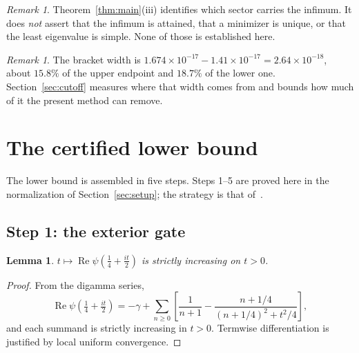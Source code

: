 \documentclass[11pt,a4paper]{article}
\newtheorem{lemma}[theorem]{Lemma}
\theoremstyle{definition}
\theoremstyle{remark}
\newtheorem{remark}[theorem]{Remark}
\begin{document}
\begin{remark}
Theorem~\ref{thm:main}(iii) identifies which sector carries the infimum. It does
\emph{not} assert that the infimum is attained, that a minimizer is unique, or
that the least eigenvalue is simple. None of those is established here.
\end{remark}

\begin{remark}
The bracket width is $1.674\times10^{-17} - 1.41\times10^{-17} = 2.64\times
10^{-18}$, about $15.8\%$ of the upper endpoint and $18.7\%$ of the lower one. Section~\ref{sec:cutoff} measures
where that width comes from and bounds how much of it the present method can
remove.
\end{remark}

\section{The certified lower bound}
\label{sec:lower}

The lower bound is assembled in five steps. Steps 1--5 are proved here in the
normalization of Section~\ref{sec:setup}; the strategy is that
of~\cite[Thm.~1.1]{Zhu}.

\subsection{Step 1: the exterior gate}

\begin{lemma}
\label{lem:gate}
$t \mapsto \operatorname{Re}\psi(\tfrac14 + \tfrac{it}{2})$ is strictly
increasing on $t > 0$.
\end{lemma}

\begin{proof}
From the digamma series,
\[
   \operatorname{Re}\psi\!\left(\tfrac14+\tfrac{it}{2}\right)
   = -\gamma + \sum_{n \ge 0}
     \left[\frac{1}{n+1} - \frac{n + 1/4}{(n+1/4)^2 + t^2/4}\right],
\]
and each summand is strictly increasing in $t > 0$. Termwise differentiation is
justified by local uniform convergence.
\end{proof}
\end{document}
